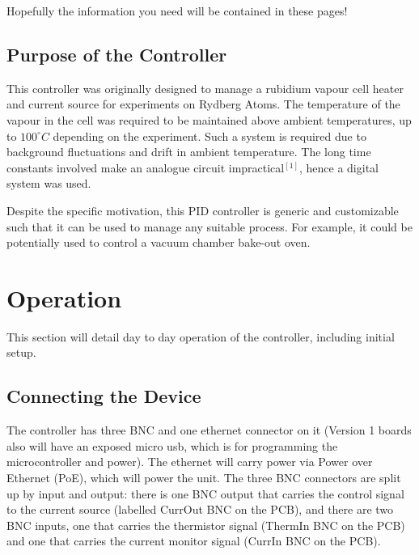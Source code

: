 \documentclass[11pt, letterpaper]{article}
\begin{document}
Hopefully the information you need will be contained in these pages!

\subsection{Purpose of the Controller}
This controller was originally designed to manage a rubidium vapour cell heater and current source for experiments on Rydberg Atoms. The temperature of the vapour in the cell was required to be maintained above ambient temperatures, up to $100^{\circ} C$ depending on the experiment. Such a system is required due to background fluctuations and drift in ambient temperature. The long time constants involved make an analogue circuit impractical$^{[1]}$, hence a digital system was used.

Despite the specific motivation, this PID controller is generic and customizable such that it can be used to manage any suitable process. For example, it could be potentially used to control a vacuum chamber bake-out oven.


\section{Operation}
This section will detail day to day operation of the controller, including initial setup.

\subsection{Connecting the Device}
The controller has three BNC and one ethernet connector on it (Version 1 boards also will have an exposed micro usb, which is for programming the microcontroller and power). The ethernet will carry power via Power over Ethernet (PoE), which will power the unit. The three BNC connectors are split up by input and output: there is one BNC output that carries the control signal to the current source (labelled CurrOut BNC on the PCB), and there are two BNC inputs, one that carries the thermistor signal (ThermIn BNC on the PCB) and one that carries the current monitor signal (CurrIn BNC on the PCB).
\end{document}
